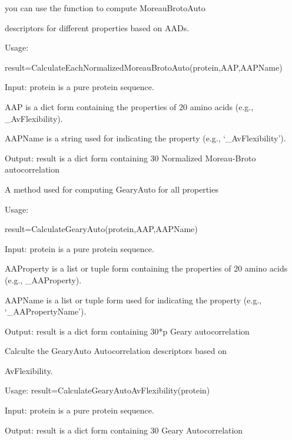 \documentclass[letterpaper,10pt,english]{sphinxmanual}
\begin{document}
\begin{fulllineitems}
\label{reference/Autocorrelation:Autocorrelation.CalculateEachNormalizedMoreauBrotoAuto}
you can use the function to compute MoreauBrotoAuto

descriptors for different properties based on AADs.

Usage:

result=CalculateEachNormalizedMoreauBrotoAuto(protein,AAP,AAPName)

Input: protein is a pure protein sequence.

AAP is a dict form containing the properties of 20 amino acids (e.g., \_AvFlexibility).

AAPName is a string used for indicating the property (e.g., `\_AvFlexibility').

Output: result is a dict form containing 30 Normalized Moreau-Broto autocorrelation

\end{fulllineitems}


\begin{fulllineitems}
\label{reference/Autocorrelation:Autocorrelation.CalculateGearyAuto}
A method used for computing GearyAuto for all properties

Usage:

result=CalculateGearyAuto(protein,AAP,AAPName)

Input: protein is a pure protein sequence.

AAProperty is a list or tuple form containing the properties of 20 amino acids (e.g., \_AAProperty).

AAPName is a list or tuple form used for indicating the property (e.g., `\_AAPropertyName').

Output: result is a dict form containing 30*p Geary autocorrelation

\end{fulllineitems}


\begin{fulllineitems}
\label{reference/Autocorrelation:Autocorrelation.CalculateGearyAutoAvFlexibility}
Calculte the GearyAuto Autocorrelation descriptors based on

AvFlexibility.

Usage:
result=CalculateGearyAutoAvFlexibility(protein)

Input: protein is a pure protein sequence.

Output: result is a dict form containing 30 Geary Autocorrelation

\end{fulllineitems}
\end{document}
